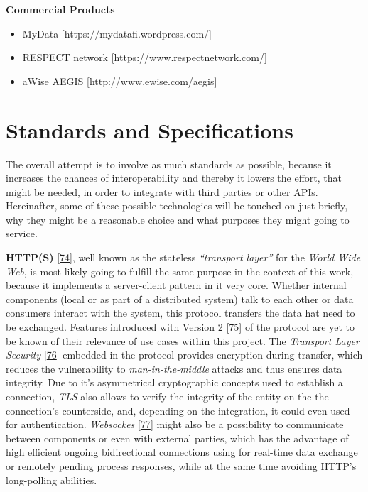 \documentclass[12pt,english,a4paper,titlepage,cleardoublepage=empty,dottedtoc]{report}
\providecommand{\tightlist}{%
  \setlength{\itemsep}{0pt}\setlength{\parskip}{0pt}}
\begin{document}
\textbf{Commercial Products}

\begin{itemize}
\tightlist
\item
  MyData {[}https://mydatafi.wordpress.com/{]}
\item
  RESPECT network {[}https://www.respectnetwork.com/{]}
\item
  aWise AEGIS {[}http://www.ewise.com/aegis{]}
\end{itemize}

\section{Standards and
Specifications}\label{standards-and-specifications}

The overall attempt is to involve as much standards as possible, because
it increases the chances of interoperability and thereby it lowers the
effort, that might be needed, in order to integrate with third parties
or other APIs. Hereinafter, some of these possible technologies will be
touched on just briefly, why they might be a reasonable choice and what
purposes they might going to service.

\textbf{\protect\hypertarget{link_http}{}{HTTP(S)}}
{[}\protect\hyperlink{ref-web_spec_http1}{74}{]}, well known as the
stateless \emph{``transport layer''} for the \emph{World Wide Web}, is
most likely going to fulfill the same purpose in the context of this
work, because it implements a server-client pattern in it very core.
Whether internal components (local or as part of a distributed system)
talk to each other or data consumers interact with the system, this
protocol transfers the data hat need to be exchanged. Features
introduced with Version 2
{[}\protect\hyperlink{ref-web_spec_http2}{75}{]} of the protocol are yet
to be known of their relevance of use cases within this project. The
\emph{Transport Layer Security}
{[}\protect\hyperlink{ref-web_spec_tls}{76}{]} embedded in the protocol
provides encryption during transfer, which reduces the vulnerability to
\emph{man-in-the-middle} attacks and thus ensures data integrity. Due to
it's asymmetrical cryptographic concepts used to establish a connection,
\emph{TLS} also allows to verify the integrity of the entity on the the
connection's counterside, and, depending on the integration, it could
even used for authentication. \emph{Websockes}
{[}\protect\hyperlink{ref-web_spec_websockets}{77}{]} might also be a
possibility to communicate between components or even with external
parties, which has the advantage of high efficient ongoing bidirectional
connections using for real-time data exchange or remotely pending
process responses, while at the same time avoiding HTTP's long-polling
abilities.
\end{document}
